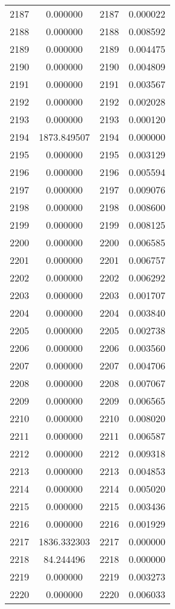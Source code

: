 \documentclass[12pt]{article}
\begin{document}
\begin{longtable}{@{}cccc@{}}
2187 & 0.000000 & 2187 & 0.000022 \\
2188 & 0.000000 & 2188 & 0.008592 \\
2189 & 0.000000 & 2189 & 0.004475 \\
2190 & 0.000000 & 2190 & 0.004809 \\
2191 & 0.000000 & 2191 & 0.003567 \\
2192 & 0.000000 & 2192 & 0.002028 \\
2193 & 0.000000 & 2193 & 0.000120 \\
2194 & 1873.849507 & 2194 & 0.000000 \\
2195 & 0.000000 & 2195 & 0.003129 \\
2196 & 0.000000 & 2196 & 0.005594 \\
2197 & 0.000000 & 2197 & 0.009076 \\
2198 & 0.000000 & 2198 & 0.008600 \\
2199 & 0.000000 & 2199 & 0.008125 \\
2200 & 0.000000 & 2200 & 0.006585 \\
2201 & 0.000000 & 2201 & 0.006757 \\
2202 & 0.000000 & 2202 & 0.006292 \\
2203 & 0.000000 & 2203 & 0.001707 \\
2204 & 0.000000 & 2204 & 0.003840 \\
2205 & 0.000000 & 2205 & 0.002738 \\
2206 & 0.000000 & 2206 & 0.003560 \\
2207 & 0.000000 & 2207 & 0.004706 \\
2208 & 0.000000 & 2208 & 0.007067 \\
2209 & 0.000000 & 2209 & 0.006565 \\
2210 & 0.000000 & 2210 & 0.008020 \\
2211 & 0.000000 & 2211 & 0.006587 \\
2212 & 0.000000 & 2212 & 0.009318 \\
2213 & 0.000000 & 2213 & 0.004853 \\
2214 & 0.000000 & 2214 & 0.005020 \\
2215 & 0.000000 & 2215 & 0.003436 \\
2216 & 0.000000 & 2216 & 0.001929 \\
2217 & 1836.332303 & 2217 & 0.000000 \\
2218 & 84.244496 & 2218 & 0.000000 \\
2219 & 0.000000 & 2219 & 0.003273 \\
2220 & 0.000000 & 2220 & 0.006033 \\

\end{longtable}
\end{document}
